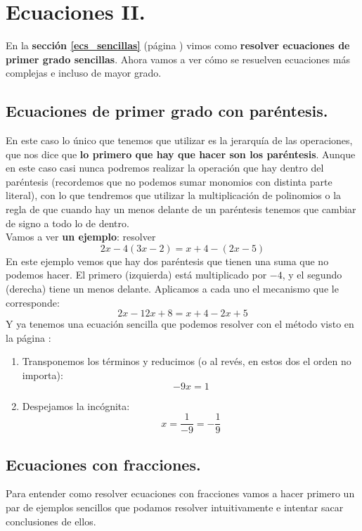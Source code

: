 \documentclass[a4paper,11pt,answers]{exam}
\begin{document}
  \section{Ecuaciones II.}
  En la \textbf{sección \ref{ecs_sencillas}} (página \pageref{ecs_sencillas}) vimos como \textbf{resolver ecuaciones de primer grado sencillas}. Ahora vamos a ver cómo se resuelven ecuaciones más complejas e incluso de mayor grado.

  \subsection{Ecuaciones de primer grado con paréntesis.} \label{ecs_parentesis}
  En este caso lo único que tenemos que utilizar es la jerarquía de las operaciones, que nos dice que \textbf{lo primero que hay que hacer son los paréntesis}. Aunque en este caso casi nunca podremos realizar la operación que hay dentro del paréntesis (recordemos que no podemos sumar monomios con distinta parte literal), con lo que tendremos que utilizar la multiplicación de polinomios o la regla de que cuando hay un menos delante de un paréntesis tenemos que cambiar de signo a todo lo de dentro.\\

  Vamos a ver \textbf{un ejemplo}: resolver
  \[2x - 4(3x - 2) = x + 4 - (2x -5)\]
  En este ejemplo vemos que hay dos paréntesis que tienen una suma que no podemos hacer. El primero (izquierda) está multiplicado por $-4$, y el segundo (derecha) tiene un menos delante. Aplicamos a cada uno el mecanismo que le corresponde:
  \[2x - 12x + 8 = x + 4 -2x + 5\]
  Y ya tenemos una ecuación sencilla que podemos resolver con el método visto en la página \pageref{ecs_sencillas}:
  \begin{enumerate}
  \item Transponemos los términos y reducimos (o al revés, en estos dos el orden no importa):
    \[-9x = 1\]
  \item Despejamos la incógnita:
    \[x = \frac{1}{-9} = -\frac{1}{9}\]
  \end{enumerate}

  \subsection{Ecuaciones con fracciones.} \label{ecs_frac}
  Para entender como resolver ecuaciones con fracciones vamos a hacer primero un par de ejemplos sencillos que podamos resolver intuitivamente e intentar sacar conclusiones de ellos.\\
\end{document}

